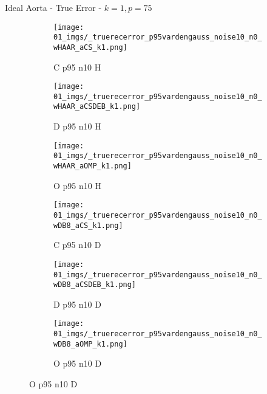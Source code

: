 \begin{frame}{Ideal Aorta - True Error - $k=1,p=75$}{}
\begin{figure}
\begin{subfigure}{0.13\textwidth}
\texttt{[image: 01\_imgs/\_truerecerror\_p95vardengauss\_noise10\_n0\_wHAAR\_aCS\_k1.png]}
\caption*{\tiny C p95 n10 H}
\end{subfigure}
\begin{subfigure}{0.13\textwidth}
\texttt{[image: 01\_imgs/\_truerecerror\_p95vardengauss\_noise10\_n0\_wHAAR\_aCSDEB\_k1.png]}
\caption*{\tiny D p95 n10 H}
\end{subfigure}
\begin{subfigure}{0.13\textwidth}
\texttt{[image: 01\_imgs/\_truerecerror\_p95vardengauss\_noise10\_n0\_wHAAR\_aOMP\_k1.png]}
\caption*{\tiny O p95 n10 H}
\end{subfigure}
\begin{subfigure}{0.13\textwidth}
\texttt{[image: 01\_imgs/\_truerecerror\_p95vardengauss\_noise10\_n0\_wDB8\_aCS\_k1.png]}
\caption*{\tiny C p95 n10 D}
\end{subfigure}
\begin{subfigure}{0.13\textwidth}
\texttt{[image: 01\_imgs/\_truerecerror\_p95vardengauss\_noise10\_n0\_wDB8\_aCSDEB\_k1.png]}
\caption*{\tiny D p95 n10 D}
\end{subfigure}
\begin{subfigure}{0.13\textwidth}
\texttt{[image: 01\_imgs/\_truerecerror\_p95vardengauss\_noise10\_n0\_wDB8\_aOMP\_k1.png]}
\caption*{\tiny O p95 n10 D}
\end{subfigure}

\vspace{5pt}


\end{figure}
\end{frame}
